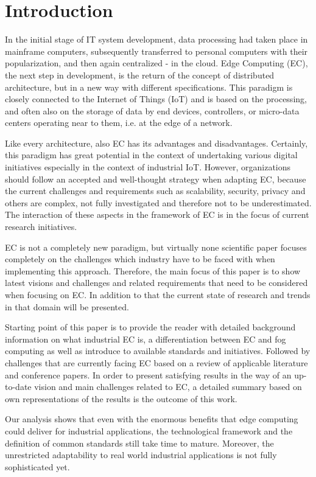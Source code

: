 \section{Introduction}\label{sec:introduction}
In the initial stage of IT system development, data processing had taken place in mainframe computers, subsequently transferred to personal computers with their popularization, and then again centralized - in the cloud. Edge Computing (EC), the next step in development, is the return of the concept of distributed architecture, but in a new way with different specifications. This paradigm is closely connected to the Internet of Things (IoT) and is based on the processing, and often also on the storage of data by end devices, controllers, or micro-data centers operating near to them, i.e. at the edge of a network.\par 
Like every architecture, also EC has its advantages and disadvantages. Certainly, this paradigm has great potential in the context of undertaking various digital initiatives especially in the context of industrial IoT. However, organizations should follow an accepted and well-thought strategy when adapting EC, because the current challenges and requirements such as scalability, security, privacy and others are complex, not fully investigated and therefore not to be underestimated. The interaction of these aspects in the framework of EC is in the focus of current research initiatives.\par
EC is not a completely new paradigm, but virtually none scientific paper focuses completely on the challenges which industry have to be faced with when implementing this approach. Therefore, the main focus of this paper is to show latest visions and challenges and related requirements that need to be considered when focusing on EC. In addition to that the current state of research and trends in that domain will be presented. \par
Starting point of this paper is to provide the reader with detailed background information on what industrial EC is, a differentiation between EC and fog computing as well as introduce to available standards and initiatives. Followed by challenges that are currently facing EC based on a review of applicable literature and conference papers. In order to present satisfying results in the way of an up-to-date vision and main challenges related to EC, a detailed summary based on own representations of the results is the outcome of this work. \par
Our analysis shows that even with the enormous benefits that edge computing could deliver for industrial applications, the technological framework and the definition of common standards still take time to mature. Moreover, the unrestricted adaptability to real world industrial applications is not fully sophisticated yet.\par 
